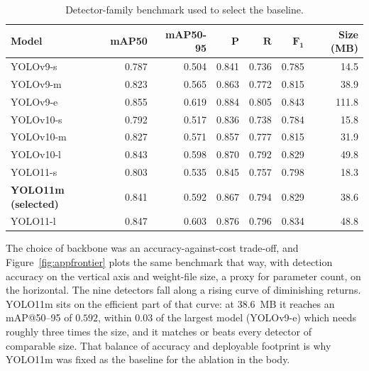 \documentclass[12pt,a4paper,oneside]{report}
\begin{document}
\begin{table}[H]
  \centering
  \caption{Detector-family benchmark used to select the baseline.}
  \label{tab:appfamily}
  \setlength{\tabcolsep}{5pt}
  \begin{tabular}{@{}l r r r r r r@{}}
    \toprule
    \textbf{Model} & \textbf{mAP50} & \textbf{mAP50-95} & \textbf{$\symbf{P}$} & \textbf{$\symbf{R}$} & \textbf{$\symbf{F_1}$} & \textbf{Size (MB)} \\
    \midrule
    YOLOv9-s   & 0.787 & 0.504 & 0.841 & 0.736 & 0.785 & 14.5 \\
    YOLOv9-m   & 0.823 & 0.565 & 0.863 & 0.772 & 0.815 & 38.9 \\
    YOLOv9-e   & 0.855 & 0.619 & 0.884 & 0.805 & 0.843 & 111.8 \\
    YOLOv10-s  & 0.792 & 0.517 & 0.836 & 0.738 & 0.784 & 15.8 \\
    YOLOv10-m  & 0.827 & 0.571 & 0.857 & 0.777 & 0.815 & 31.9 \\
    YOLOv10-l  & 0.843 & 0.598 & 0.870 & 0.792 & 0.829 & 49.8 \\
    YOLO11-s   & 0.803 & 0.535 & 0.845 & 0.757 & 0.798 & 18.3 \\
    \textbf{YOLO11m (selected)} & 0.841 & 0.592 & 0.867 & 0.794 & 0.829 & 38.6 \\
    YOLO11-l   & 0.847 & 0.603 & 0.876 & 0.796 & 0.834 & 48.8 \\
    \bottomrule
  \end{tabular}
\end{table}

The choice of backbone was an accuracy-against-cost trade-off, and
Figure~\ref{fig:appfrontier} plots the same benchmark that way, with detection
accuracy on the vertical axis and weight-file size, a proxy for parameter
count, on the horizontal. The nine detectors fall along a rising curve of
diminishing returns. YOLO11m sits on the efficient part of that curve: at
$38.6$~MB it reaches an mAP@50--95 of $0.592$, within $0.03$ of the largest
model (YOLOv9-e) which needs roughly three times the size, and it matches or
beats every detector of comparable size. That balance of accuracy and
deployable footprint is why YOLO11m was fixed as the baseline for the ablation
in the body.
\end{document}
